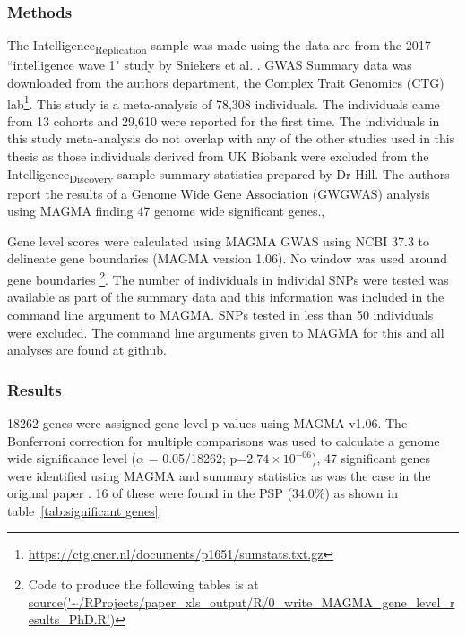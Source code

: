 \subsubsection{Methods}
The Intelligence\textsubscript{Replication} sample was made using the data are from the 2017 ``intelligence wave 1" study by Sniekers et al. \cite{sniekers2017genome}. 
GWAS Summary data was downloaded from the authors department, the Complex Trait Genomics (CTG) lab\footnote{ \url{https://ctg.cncr.nl/documents/p1651/sumstats.txt.gz}}. This study is a meta-analysis of 78,308 individuals. The individuals came from 13 cohorts and 29,610 were reported for the first time. The individuals in this study meta-analysis do not overlap with any of the other studies used in this thesis as those individuals derived from UK Biobank were excluded from the Intelligence\textsubscript{Discovery} sample summary statistics prepared by Dr Hill. The authors report the results of a Genome Wide Gene Association (GWGWAS) analysis using MAGMA finding 47 genome wide significant genes.\cite{sniekers2017genome},\cite{de2015magma}

Gene level scores were calculated using MAGMA GWAS using NCBI 37.3 to delineate gene boundaries (MAGMA version 1.06). No window was used around gene boundaries \footnote{Code to produce the following tables is at \url{source('~/RProjects/paper_xls_output/R/0_write_MAGMA_gene_level_results_PhD.R')} }.
 The number of individuals in individal  SNPs were tested was available as part of the summary data and this information was included in the command line argument to MAGMA. SNPs tested in less than 50 individuals were excluded. The command line arguments given to MAGMA for this and all analyses are found at github.
\subsubsection{Results}
18262 genes were assigned gene level p values using MAGMA v1.06.
The Bonferroni correction for multiple comparisons was used to calculate a genome wide significance level ($\alpha$ = 0.05/18262; p=$2.74 \times 10^{-06}$),  47 significant genes were identified using MAGMA and summary statistics as was the case in the original paper \cite{sniekers2017genome}. 16 of these were found in the PSP (34.0\%) as shown in table~\ref{tab:significant genes}.

